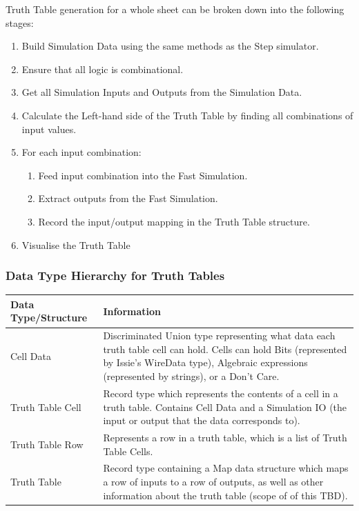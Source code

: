 Truth Table generation for a whole sheet can be broken down into the following stages:
\begin{enumerate}
    \item Build Simulation Data using the same methods as the Step simulator.
    \item Ensure that all logic is combinational.
    \item Get all Simulation Inputs and Outputs from the Simulation Data.
    \item Calculate the Left-hand side of the Truth Table by finding all combinations of input values.
    \item For each input combination:
    \begin{enumerate}
        \item Feed input combination into the Fast Simulation.
        \item Extract outputs from the Fast Simulation.
        \item Record the input/output mapping in the Truth Table structure.
    \end{enumerate}
    \item Visualise the Truth Table
\end{enumerate}

\newcommand{\ttCellData}{
    Discriminated Union type representing what data each truth table cell can hold. Cells can hold Bits (represented by Issie's WireData type), Algebraic expressions (represented by strings), or a Don't Care.
}

\newcommand{\ttCell}{
    Record type which represents the contents of a cell in a truth table. Contains Cell Data and a Simulation IO (the input or output that the data corresponds to).
}

\newcommand{\ttRow}{
    Represents a row in a truth table, which is a list of Truth Table Cells.
}

\newcommand{\truthtable}{
    Record type containing a Map data structure which maps a row of inputs to a row of outputs, as well as other information about the truth table (scope of of this TBD).
}

\subsubsection{Data Type Hierarchy for Truth Tables}
\begin{table} [h!]
    \centering
    \begin{tabular}{| m{4cm} | m{10cm} |}
        \hline
        \textbf{Data Type/Structure} & \textbf{Information} \\
        \hline
        Cell Data & \ttCellData \\
        \hline
        Truth Table Cell & \ttCell \\
        \hline
        Truth Table Row & \ttRow \\
        \hline
        Truth Table & \truthtable \\
        \hline
    \end{tabular}
\end{table}


